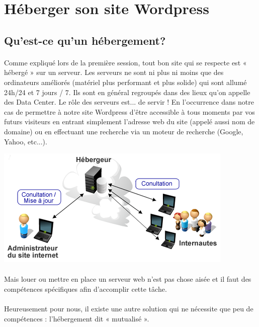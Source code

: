 \documentclass[10pt,a4paper]{article}
\begin{document}
\section{Héberger son site Wordpress}
\subsection{Qu'est-ce qu'un hébergement?}
\paragraph{}Comme expliqué lors de la première session, tout bon site qui se respecte est « hébergé » sur un serveur. Les serveurs ne sont ni plus ni moins que des ordinateurs améliorés (matériel plus performant et plus solide) qui sont allumé 24h/24 et 7 jours / 7. Ils sont en général regroupés dans des lieux qu'on appelle des Data Center. Le rôle des serveurs est... de servir ! En l'occurrence dans notre cas de permettre à notre site Wordpress d'être accessible à tous moments par vos futurs visiteurs en entrant simplement l'adresse web du site (appelé aussi nom de domaine) ou en effectuant une recherche via un moteur de recherche (Google, Yahoo, etc...).
\begin{center}
\includegraphics[scale=0.5]{img/0006.png}
\end{center}
\paragraph{}Mais louer ou mettre en place un serveur web n'est pas chose aisée et il faut des compétences spécifiques afin d'accomplir cette tâche.
\paragraph{}Heureusement pour nous, il existe une autre solution qui ne nécessite que peu de compétences : l'hébergement dit « mutualisé ».
\end{document}
